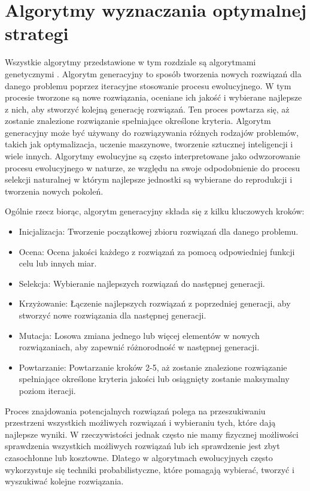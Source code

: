 \documentclass[inzynierska]{pwr_wmat_praca_dyplomowa}
\theoremstyle{plain}
\numberwithin{theorem}{chapter}
\theoremstyle{definition}
\numberwithin{theorem}{chapter}
\begin{document}
	\section{Algorytmy wyznaczania optymalnej strategi}
	Wszystkie algorytmy przedstawione w tym rozdziale są algorytmami genetycznymi \cite{Figielska2006}. 
	Algorytm generacyjny to sposób tworzenia nowych rozwiązań dla danego problemu poprzez iteracyjne stosowanie procesu ewolucyjnego. W tym procesie tworzone są nowe rozwiązania, oceniane ich jakość i wybierane najlepsze z nich, aby stworzyć kolejną generację rozwiązań. Ten proces powtarza się, aż zostanie znalezione rozwiązanie spełniające określone kryteria. Algorytm generacyjny może być używany do rozwiązywania różnych rodzajów problemów, takich jak optymalizacja, uczenie maszynowe, tworzenie sztucznej inteligencji i wiele innych. Algorytmy ewolucyjne są często interpretowane jako odwzorowanie procesu ewolucyjnego w naturze, ze względu na swoje odpodobnienie do procesu selekcji naturalnej w którym najlepsze jednostki są wybierane do reprodukcji i tworzenia nowych pokoleń.
	
	Ogólnie rzecz biorąc, algorytm generacyjny składa się z kilku kluczowych kroków:
	\begin{itemize}
		\item Inicjalizacja: Tworzenie początkowej zbioru rozwiązań dla danego problemu.
		\item Ocena: Ocena jakości każdego z rozwiązań za pomocą odpowiedniej funkcji celu lub innych miar.
		\item Selekcja: Wybieranie najlepszych rozwiązań do następnej generacji.
		\item Krzyżowanie: Łączenie najlepszych rozwiązań z poprzedniej generacji, aby stworzyć nowe rozwiązania dla następnej generacji.
		\item Mutacja: Losowa zmiana jednego lub więcej elementów w nowych rozwiązaniach, aby zapewnić różnorodność w następnej generacji.
		\item Powtarzanie: Powtarzanie kroków 2-5, aż zostanie znalezione rozwiązanie spełniające określone kryteria jakości lub osiągnięty zostanie maksymalny poziom iteracji.
	\end{itemize}	
	Proces znajdowania potencjalnych rozwiązań polega na przeszukiwaniu przestrzeni wszystkich możliwych rozwiązań i wybieraniu tych, które dają najlepsze wyniki. W rzeczywistości jednak często nie mamy fizycznej możliwości sprawdzenia wszystkich możliwych rozwiązań lub ich sprawdzenie jest zbyt czasochłonne lub kosztowne. Dlatego w algorytmach ewolucyjnych często wykorzystuje się techniki probabilistyczne, które pomagają wybierać, tworzyć i wyszukiwać kolejne rozwiązania.
	
\end{document}
